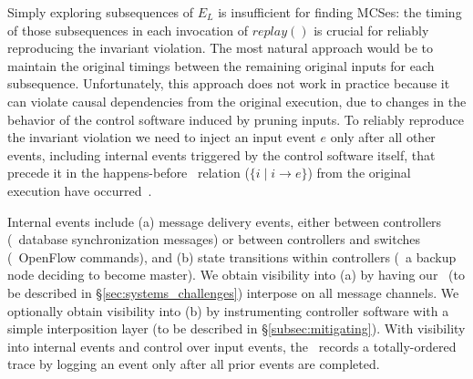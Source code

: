 Simply exploring subsequences of $E_L$ is insufficient for finding MCSes: the
timing of those subsequences in each invocation of $replay()$ is crucial for reliably
reproducing the
invariant violation. The most natural approach would be to maintain the original
timings between the remaining original inputs for each subsequence.
Unfortunately, this approach does not work in practice because it can violate
causal dependencies from the original execution, due to changes in the behavior
of the control software induced by pruning inputs. %
To reliably reproduce the invariant violation
we need to inject an input event $e$ only after all other
events, including internal events triggered by the control software itself,
that precede it in the
happens-before~\cite{Lamport:1978:TCO:359545.359563}
relation ($\{i \mid i \rightarrow e\}$) from the original execution have
occurred~\cite{tel2000introduction}.

Internal events include
(a) message delivery events, either between controllers (\eg~database
synchronization messages) or
between controllers and switches (\eg~OpenFlow commands), and (b) state transitions
within controllers (\eg~a backup node deciding to become master).
We obtain visibility into (a) by having our
\tester~(to be described in \S\ref{sec:systems_challenges}) interpose on all message channels.
We optionally obtain visibility into (b) by instrumenting controller
software with a simple interposition layer (to be described in \S\ref{subsec:mitigating}).
With visibility into internal events and control over input events, the
\tester~records a totally-ordered trace by logging an event only after
all prior events are completed.


